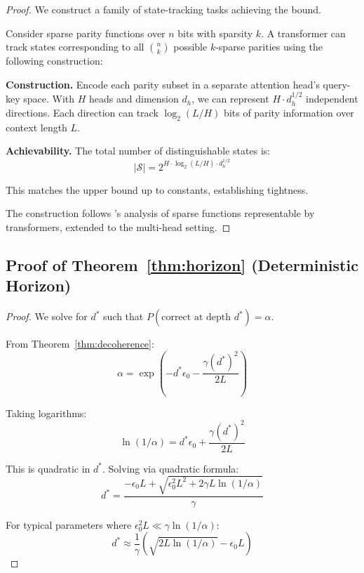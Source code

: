 \documentclass{article}
\theoremstyle{plain}
\theoremstyle{definition}
\theoremstyle{remark}
\begin{document}
\begin{proof}
We construct a family of state-tracking tasks achieving the bound.

Consider sparse parity functions over $n$ bits with sparsity $k$. A transformer can track states corresponding to all $\binom{n}{k}$ possible $k$-sparse parities using the following construction:

\textbf{Construction.} Encode each parity subset in a separate attention head's query-key space. With $H$ heads and dimension $d_h$, we can represent $H \cdot d_h^{1/2}$ independent directions. Each direction can track $\log_2(L/H)$ bits of parity information over context length $L$.

\textbf{Achievability.} The total number of distinguishable states is:
\begin{equation}
|\mathcal{S}| = 2^{H \cdot \log_2(L/H) \cdot d_h^{1/2}}
\end{equation}

This matches the upper bound up to constants, establishing tightness.

The construction follows \citet{sanford2024representational}'s analysis of sparse functions representable by transformers, extended to the multi-head setting.
\end{proof}

\subsection{Proof of Theorem~\ref{thm:horizon} (Deterministic Horizon)}

\begin{proof}
We solve for $d^*$ such that $P(\text{correct at depth } d^*) = \alpha$.

From Theorem~\ref{thm:decoherence}:
\begin{equation}
\alpha = \exp\left(-d^*\epsilon_0 - \frac{\gamma (d^*)^2}{2L}\right)
\end{equation}

Taking logarithms:
\begin{equation}
\ln(1/\alpha) = d^*\epsilon_0 + \frac{\gamma (d^*)^2}{2L}
\end{equation}

This is quadratic in $d^*$. Solving via quadratic formula:
\begin{equation}
d^* = \frac{-\epsilon_0 L + \sqrt{\epsilon_0^2 L^2 + 2\gamma L \ln(1/\alpha)}}{\gamma}
\end{equation}

For typical parameters where $\epsilon_0^2 L \ll \gamma \ln(1/\alpha)$:
\begin{equation}
d^* \approx \frac{1}{\gamma}\left(\sqrt{2L \ln(1/\alpha)} - \epsilon_0 L\right)
\end{equation}
\end{proof}
\end{document}
